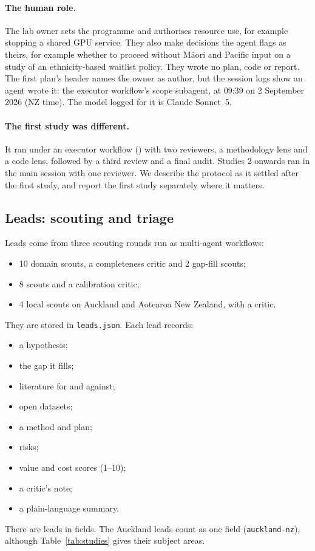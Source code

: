 \documentclass[11pt]{article}
\begin{document}
\paragraph{The human role.} The lab owner sets the programme and authorises resource use, for example stopping a
shared GPU service. They also make decisions the agent flags as theirs, for example whether to proceed without M\=aori
and Pacific input on a study of an ethnicity-based waitlist policy. They wrote no plan, code or report. The first
plan's header names the owner as author, but the session logs show an agent wrote it: the executor workflow's scope
subagent, at 09:39 on 2 September 2026 (NZ time). The model logged for it is Claude Sonnet~5.

\paragraph{The first study was different.} It ran under an executor workflow () with two reviewers,
a methodology lens and a code lens, followed by a third review and a final audit. Studies 2 onwards ran in the main
session with one reviewer. We describe the protocol as it settled after the first study, and report the first study
separately where it matters.

\subsection{Leads: scouting and triage}

Leads come from three scouting rounds run as multi-agent workflows:
\begin{itemize}
\item 10 domain scouts, a completeness critic and 2 gap-fill scouts;
\item 8 scouts and a calibration critic;
\item 4 local scouts on Auckland and Aotearoa New Zealand, with a critic.
\end{itemize}

They are stored in \texttt{leads.json}. Each lead records:
\begin{itemize}
\item a hypothesis;
\item the gap it fills;
\item literature for and against;
\item open datasets;
\item a method and plan;
\item risks;
\item value and cost scores (1--10);
\item a critic's note;
\item a plain-language summary.
\end{itemize}
There are \LeadsTotal{} leads in \LeadDomains{} fields. The Auckland leads count as one field (\texttt{auckland-nz}),
although Table~\ref{tab:studies} gives their subject areas.
\end{document}
